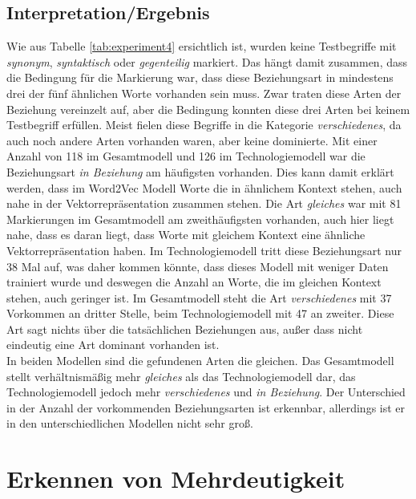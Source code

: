\documentclass[12pt,a4paper]{report}
\begin{document}
		
		
		
		
		
		\subsection*{Interpretation/Ergebnis}
		Wie aus Tabelle \ref{tab:experiment4} ersichtlich ist, wurden keine Testbegriffe mit \textit{synonym}, \textit{syntaktisch} oder \textit{gegenteilig} markiert. Das hängt damit zusammen, dass die Bedingung für die Markierung war, dass diese Beziehungsart in mindestens drei der fünf ähnlichen Worte vorhanden sein muss. Zwar traten diese Arten der Beziehung vereinzelt auf, aber die Bedingung konnten diese drei Arten bei keinem Testbegriff erfüllen. Meist fielen diese Begriffe in die Kategorie \textit{verschiedenes}, da auch noch andere Arten vorhanden waren, aber keine dominierte. Mit einer Anzahl von 118 im Gesamtmodell und 126 im Technologiemodell war die Beziehungsart \textit{in Beziehung} am häufigsten vorhanden. Dies kann damit erklärt werden, dass im Word2Vec Modell Worte die in ähnlichem Kontext stehen, auch nahe in der Vektorrepräsentation zusammen stehen. Die Art \textit{gleiches} war mit 81 Markierungen im Gesamtmodell am zweithäufigsten vorhanden, auch hier liegt nahe, dass es daran liegt, dass Worte mit gleichem Kontext eine ähnliche Vektorrepräsentation haben. Im Technologiemodell tritt diese Beziehungsart nur 38 Mal auf, was daher kommen könnte, dass dieses Modell mit weniger Daten trainiert wurde und deswegen die Anzahl an Worte, die im gleichen Kontext stehen, auch geringer ist. Im Gesamtmodell steht die Art \textit{verschiedenes} mit 37 Vorkommen an dritter Stelle, beim Technologiemodell mit 47 an zweiter. Diese Art sagt nichts über die tatsächlichen Beziehungen aus, außer dass nicht eindeutig eine Art dominant vorhanden ist. \\
		In beiden Modellen sind die gefundenen Arten die gleichen. Das Gesamtmodell stellt verhältnismäßig mehr \textit{gleiches} als das Technologiemodell dar, das Technologiemodell jedoch mehr \textit{verschiedenes} und \textit{in Beziehung}. Der Unterschied in der Anzahl der vorkommenden Beziehungsarten ist erkennbar, allerdings ist er in den unterschiedlichen Modellen nicht sehr groß.
		
		
		
		
		
		
	
	\section{Erkennen von Mehrdeutigkeit}
	
\end{document}
